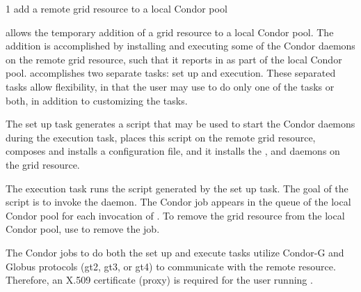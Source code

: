 \begin{ManPage}{\label{man-condor-glidein}}{1}
{add a remote grid resource to a local Condor pool}
\Synopsis
{}



\Description

 allows the temporary addition of a grid resource to
a local Condor pool.
The addition is accomplished by installing and executing some of the Condor
daemons on the remote grid resource,
such that it reports in as part of the local Condor pool.
 accomplishes two separate tasks: set up and execution.
These separated tasks allow flexibility, 
in that the user may use  to do only one
of the tasks or both, 
in addition to customizing the tasks.

The set up task generates a script that may be used
to start the Condor daemons during the execution task,
places this script on the remote grid resource,
composes and installs a configuration file,
and it installs the , 
and  daemons on the grid resource.

The execution task runs the script generated by
the set up task.
The goal of the script is to invoke the  daemon.
The Condor job  appears in the queue of the local
Condor pool for each invocation of  .
To remove the grid resource from the local Condor pool,
use  to remove the  job.

The Condor jobs to do both the set up and execute tasks
utilize
Condor-G and Globus protocols
(gt2, gt3, or gt4) to communicate with 
the remote resource.
Therefore,
an X.509 certificate (proxy) is required
for the user running .


\end{ManPage}

